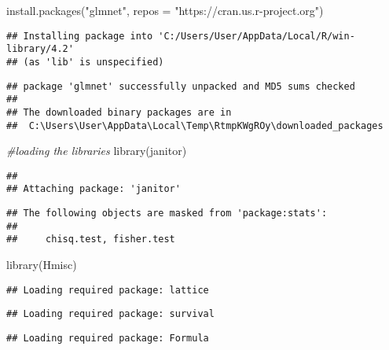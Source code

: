 \documentclass[
]{article}
\newenvironment{Shaded}{\begin{snugshade}}{\end{snugshade}}
\newcommand{\AttributeTok}[1]{\textcolor[rgb]{0.77,0.63,0.00}{#1}}
\newcommand{\CommentTok}[1]{\textcolor[rgb]{0.56,0.35,0.01}{\textit{#1}}}
\newcommand{\FunctionTok}[1]{\textcolor[rgb]{0.00,0.00,0.00}{#1}}
\newcommand{\NormalTok}[1]{#1}
\newcommand{\StringTok}[1]{\textcolor[rgb]{0.31,0.60,0.02}{#1}}
\begin{document}
\begin{Shaded}
\begin{Highlighting}[]
\FunctionTok{install.packages}\NormalTok{(}\StringTok{"glmnet"}\NormalTok{, }\AttributeTok{repos =} \StringTok{"https://cran.us.r{-}project.org"}\NormalTok{)}
\end{Highlighting}
\end{Shaded}

\begin{verbatim}
## Installing package into 'C:/Users/User/AppData/Local/R/win-library/4.2'
## (as 'lib' is unspecified)
\end{verbatim}

\begin{verbatim}
## package 'glmnet' successfully unpacked and MD5 sums checked
## 
## The downloaded binary packages are in
##  C:\Users\User\AppData\Local\Temp\RtmpKWgROy\downloaded_packages
\end{verbatim}

\begin{Shaded}
\begin{Highlighting}[]
\CommentTok{\#loading the libraries}
\FunctionTok{library}\NormalTok{(janitor)}
\end{Highlighting}
\end{Shaded}

\begin{verbatim}
## 
## Attaching package: 'janitor'
\end{verbatim}

\begin{verbatim}
## The following objects are masked from 'package:stats':
## 
##     chisq.test, fisher.test
\end{verbatim}

\begin{Shaded}
\begin{Highlighting}[]
\FunctionTok{library}\NormalTok{(Hmisc)}
\end{Highlighting}
\end{Shaded}

\begin{verbatim}
## Loading required package: lattice
\end{verbatim}

\begin{verbatim}
## Loading required package: survival
\end{verbatim}

\begin{verbatim}
## Loading required package: Formula
\end{verbatim}
\end{document}
